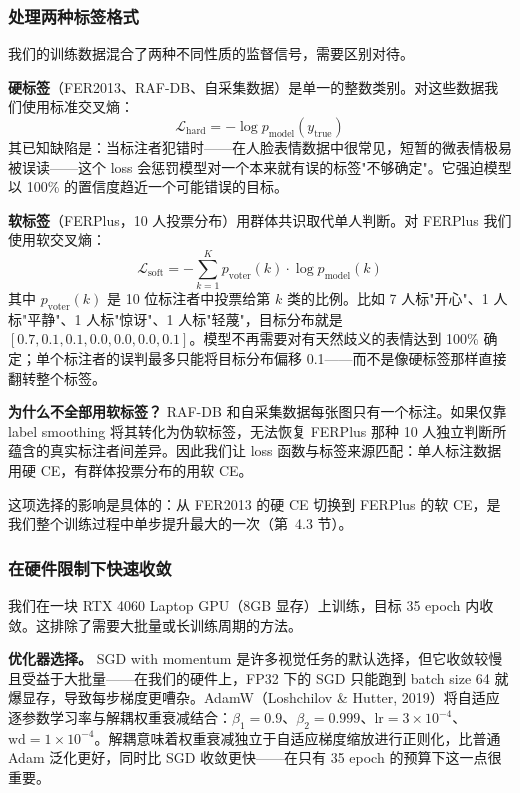 \documentclass[12pt,a4paper]{ctexart}
\begin{document}
\subsubsection{处理两种标签格式}

我们的训练数据混合了两种不同性质的监督信号，需要区别对待。

\textbf{硬标签}（FER2013、RAF-DB、自采集数据）是单一的整数类别。对这些数据我们使用标准交叉熵：
\begin{equation}
\mathcal{L}_{\text{hard}} = -\log p_{\text{model}}(y_{\text{true}})
\end{equation}
其已知缺陷是：当标注者犯错时——在人脸表情数据中很常见，短暂的微表情极易被误读——这个 loss 会惩罚模型对一个本来就有误的标签"不够确定"。它强迫模型以 100\% 的置信度趋近一个可能错误的目标。

\textbf{软标签}（FERPlus，10 人投票分布）用群体共识取代单人判断。对 FERPlus 我们使用软交叉熵：
\begin{equation}
\mathcal{L}_{\text{soft}} = -\sum_{k=1}^{K} p_{\text{voter}}(k) \cdot \log p_{\text{model}}(k)
\end{equation}
其中 $p_{\text{voter}}(k)$ 是 10 位标注者中投票给第 $k$ 类的比例。比如 7 人标"开心"、1 人标"平静"、1 人标"惊讶"、1 人标"轻蔑"，目标分布就是 $[0.7, 0.1, 0.1, 0.0, 0.0, 0.0, 0.1]$。模型不再需要对有天然歧义的表情达到 100\% 确定；单个标注者的误判最多只能将目标分布偏移 0.1——而不是像硬标签那样直接翻转整个标签。

\textbf{为什么不全部用软标签？} RAF-DB 和自采集数据每张图只有一个标注。如果仅靠 label smoothing 将其转化为伪软标签，无法恢复 FERPlus 那种 10 人独立判断所蕴含的真实标注者间差异。因此我们让 loss 函数与标签来源匹配：单人标注数据用硬 CE，有群体投票分布的用软 CE。

这项选择的影响是具体的：从 FER2013 的硬 CE 切换到 FERPlus 的软 CE，是我们整个训练过程中单步提升最大的一次（第~4.3 节）。

\subsubsection{在硬件限制下快速收敛}

我们在一块 RTX 4060 Laptop GPU（8GB 显存）上训练，目标 35 epoch 内收敛。这排除了需要大批量或长训练周期的方法。

\textbf{优化器选择。} SGD with momentum 是许多视觉任务的默认选择，但它收敛较慢且受益于大批量——在我们的硬件上，FP32 下的 SGD 只能跑到 batch size 64 就爆显存，导致每步梯度更嘈杂。AdamW（Loshchilov \& Hutter, 2019）将自适应逐参数学习率与解耦权重衰减结合：$\beta_1=0.9$、$\beta_2=0.999$、$\text{lr}=3\times10^{-4}$、$\text{wd}=1\times10^{-4}$。解耦意味着权重衰减独立于自适应梯度缩放进行正则化，比普通 Adam 泛化更好，同时比 SGD 收敛更快——在只有 35 epoch 的预算下这一点很重要。
\end{document}
